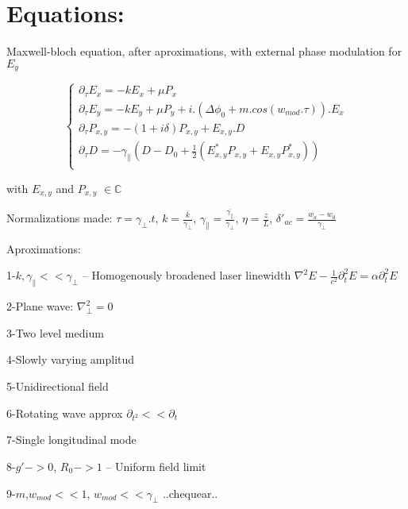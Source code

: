 \documentclass[a4paper,11pt,spanish,sans]{exam}
\begin{document}
\section{ Equations:}


Maxwell-bloch equation, after aproximations, with external phase modulation for $E_y$

\[
\begin{cases}
\partial_{\tau} E_x=-k E_x + \mu P_x \\
\partial_{\tau} E_y=-k E_y + \mu P_y + i.(\Delta \phi_0 + m.cos(w_{mod}.\tau)).E_x \\
\partial_{\tau} P_{x,y}=-(1+i\delta)P_{x,y}+E_{x,y}.D \\
\partial_{\tau} D=-\gamma_{||}(D-D_0+\tfrac{1}{2}(E^*_{x,y}P_{x,y}+E_{x,y}P^*_{x,y})) \\
\end{cases}
\]


with $ E_{x,y}$ and $P_{x,y}$  $\in \mathbb{C}$

Normalizations made: 
$\tau= \gamma_{\bot}.t$, $k=\tfrac{\bar{k}}{\gamma_{\bot}}$,  $\gamma_{\parallel}=\tfrac{\bar{\gamma_{\parallel}}}{\gamma_{\bot}}$, $\eta=\tfrac{z}{L}$, $\delta'_{ac}=\tfrac{w_a-w_0}{\gamma_{\bot}}$


Aproximations: 

1-$k,\gamma_{\parallel}<<\gamma_{\bot}$   -- Homogenously broadened laser linewidth $ \nabla^2 E-\frac{1}{c^2}\partial^2_{t}E=\alpha \partial^2_{t}E$

2-Plane wave: $\nabla^2_{\bot}=0$

3-Two level medium

4-Slowly varying amplitud

5-Unidirectional field

6-Rotating wave approx $\partial_{t^2}<<\partial_t$

7-Single longitudinal mode

8-$g'->0$, $R_0->1$  -- Uniform field limit

9-$m$,$w_{mod}<<1$, $w_{mod}<<\gamma_{\bot}$  ..chequear..
\end{document}
